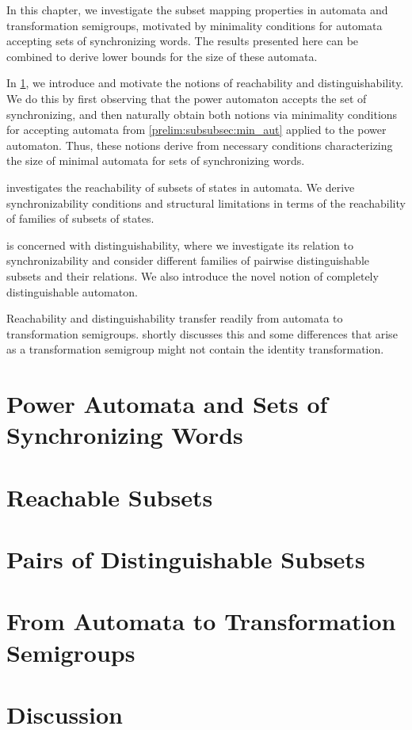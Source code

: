 
In this chapter, we investigate the subset mapping properties in automata and transformation semigroups, motivated by minimality conditions for automata accepting sets of synchronizing words. The results presented here can be combined to derive lower bounds for the size of these automata.

In \cref{sync_max:sec:power_automat_for_SynA},
we introduce and motivate the notions of reachability
and distinguishability. 
We do this by first observing
that the power automaton accepts the set of synchronizing,
and then naturally obtain both notions
via minimality conditions for accepting automata from \cref{prelim:subsubsec:min_aut} applied to the power automaton. 
Thus, these notions derive from necessary conditions
characterizing the size of minimal automata for sets of synchronizing words.

 investigates the reachability of subsets of states in automata.
We derive synchronizability conditions and 
structural limitations in terms of the reachability
of families of subsets of states.

is concerned with distinguishability,
where we investigate
its relation to synchronizability and 
consider different families of pairwise distinguishable subsets
and their relations. We also introduce the novel notion of completely distinguishable automaton.

Reachability and distinguishability transfer readily from automata
to transformation semigroups. 
shortly discusses this and some differences that arise as a transformation
semigroup might not contain the identity transformation.

\section{Power Automata and Sets of Synchronizing Words}
\label{sync_max:sec:power_automat_for_SynA}



\section{Reachable Subsets}
\label{sync_max:sec:reachable}



\section{Pairs of Distinguishable Subsets} %
\label{sync_max:sec:distinguish}



\section{From Automata to Transformation Semigroups}
\label{sync_max:sec:from_aut_to_semigroups} 



\section{Discussion}
\label{sync_max:chap_subset_mapping:discussion}

